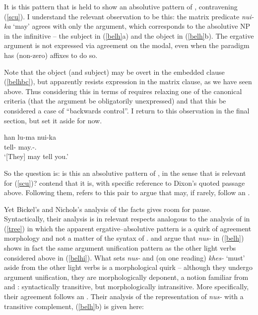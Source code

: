 \documentclass[output=paper]{langsci/langscibook}
\begin{document}
It is this pattern that is held to show an absolutive pattern of ,
contravening (\ref{scu}). I understand the relevant observation to be this: the
matrix predicate \emph{nui-ka} `may' agrees with only the \Ssg{} argument,
which corresponds to the absolutive NP in the infinitive -- the subject in
(\ref{belh}a) and the object in (\ref{belh}b). The ergative argument is not
expressed via agreement on the modal, even when the paradigm has (non-zero)
affixes to do so.

Note that the object (and subject) may be overt in the embedded clause
(\ref{belhbc}), but apparently resists expression in the matrix clause, as we
have seen above. Thus considering this in terms of  requires relaxing
one of the canonical criteria (that the argument be obligatorily unexpressed)
and that this be considered a case of \enquote{backwards control}. I return to
this observation in the final section, but set it aside for now.

\ea \label{belhbc}
       \gll han lu-ma nui-ka \\
       \Second{} tell-\Inf{} may.\Npst-\Second.\Su{} \\
	\glt `[They] may tell you.' \citep[156]{bickel04}
\z

So the question is: is this an absolutive pattern of , in the sense that
is relevant for (\ref{scu})? \citet{bicknich01} contend that it is, with
specific reference to Dixon's quoted passage above. Following them,
\cite{malchukov14} refers to this pair to argue that  may, if rarely,
follow an .

Yet Bickel's and Nichols's analysis of the facts gives room for pause.
Syntactically, their analysis is in relevant respects analogous to the analysis
of  in (\ref{tree}) in which the apparent ergative--absolutive
pattern is a quirk of agreement morphology and not a matter of the syntax of
.  \cite{bickel04} and \citet{bicknich01} argue that \emph{nus-}
in (\ref{belh}) shows in fact the same argument unification pattern as the
other light verbs considered above in (\ref{belhi}). What sets \emph{nus-} and
(on one reading) \emph{khes-} `must' aside from the other light verbs is a
morphological quirk -- although they undergo argument unification, they are
morphologically deponent, a notion familiar from  and 
\citep{baermanetal07}: syntactically transitive, but morphologically
intransitive. More specifically, their agreement follows an . Their analysis of the representation of \emph{nus-} with a
transitive complement, (\ref{belh}b) is given here:
\end{document}
